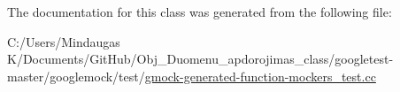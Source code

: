 The documentation for this class was generated from the following file\+:\begin{DoxyCompactItemize}
\item 
C\+:/\+Users/\+Mindaugas K/\+Documents/\+Git\+Hub/\+Obj\+\_\+\+Duomenu\+\_\+apdorojimas\+\_\+class/googletest-\/master/googlemock/test/\mbox{\hyperlink{googletest-master_2googlemock_2test_2gmock-generated-function-mockers__test_8cc}{gmock-\/generated-\/function-\/mockers\+\_\+test.\+cc}}\end{DoxyCompactItemize}
